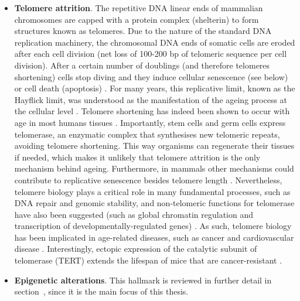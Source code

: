 \begin{itemize}
	\item \textbf{Telomere attrition}. The repetitive DNA linear ends of mammalian chromosomes are capped with a protein complex (shelterin) to form structures known as telomeres. Due to the nature of the standard DNA replication machinery, the chromosomal DNA ends of somatic cells are eroded after each cell division (net loss of 100-200 bp of telomeric sequence per cell division). After a certain number of doublings (and therefore telomeres shortening) cells stop diving and they induce cellular senescence (see below) or cell death (apoptosis) \cite{OSullivan2010}. For many years, this replicative limit, known as the Hayflick limit, was understood as the manifestation of the ageing process at the cellular level \cite{Hayflick1961,Hayflick1998}. Telomere shortening has indeed been shown to occur with age in most humans tissues \cite{Blasco2007}. Importantly, stem cells and germ cells express telomerase, an enzymatic complex that synthesises new telomeric repeats, avoiding telomere shortening. This way organisms can regenerate their tissues if needed, which makes it unlikely that telomere attrition is the only mechanism behind ageing. Furthermore, in mammals other mechanisms could contribute to replicative senescence besides telomere length \cite{OSullivan2010}. Nevertheless, telomere biology plays a critical role in many fundamental processes, such as DNA repair and genomic stability, and non-telomeric functions for telomerase have also been suggested (such as global chromatin regulation and transcription of developmentally-regulated genes) \cite{OSullivan2010}. As such, telomere biology has been implicated in age-related diseases, such as cancer and cardiovascular disease \cite{OSullivan2010,Blasco2007}. Interestingly, ectopic expression of the catalytic subunit of telomerase (TERT) extends the lifespan of mice that are cancer-resistant \cite{Tomas-Loba2008}. 
	
	\item \textbf{Epigenetic alterations}. This hallmark is reviewed in further detail in section~, since it is the main focus of this thesis.
	

\end{itemize}
